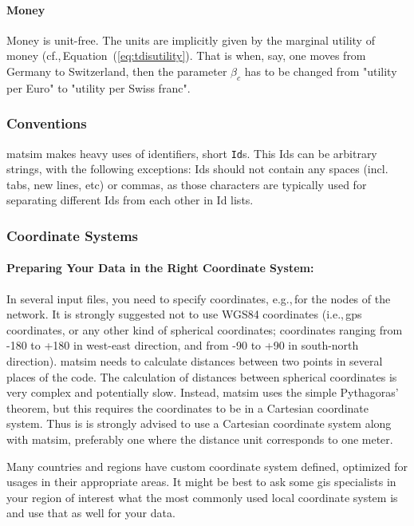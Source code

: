 \paragraph{Money}

Money is unit-free. The units are implicitly given by the marginal utility of money (cf.,\,Equation~(\ref{eq:tdisutility}). That is when, say, one moves from Germany to Switzerland, then the parameter $\beta_c$ has to be changed from "utility per Euro" to "utility per Swiss franc".

\subsubsection{Conventions}
\gls{matsim} makes heavy uses of identifiers, short \lstinline|Id|s. This Ids can be arbitrary strings, with the following exceptions: Ids should not contain any spaces (incl. tabs, new lines, etc) or commas, as those characters are typically used for separating different Ids from each other in Id lists. 

\subsubsection{Coordinate Systems}
\label{sec:coordinatesystems}
\paragraph{Preparing Your Data in the Right Coordinate System:}
In several input files, you need to specify coordinates, e.g.,\,for the nodes of the network. It is strongly suggested not to use WGS84 coordinates (i.e.,\,\gls{gps} coordinates, or any other kind of spherical coordinates; coordinates ranging from -180 to +180 in west-east direction, and from -90 to +90 in south-north direction). \gls{matsim} needs to calculate distances between two points in several places of the code. The calculation of distances between spherical coordinates is very complex and potentially slow. Instead, \gls{matsim} uses the simple Pythagoras' theorem, but this requires the coordinates to be in a Cartesian coordinate system. Thus is is strongly advised to use a Cartesian coordinate system along with \gls{matsim}, preferably one where the distance unit corresponds to one meter.

Many countries and regions have custom coordinate system defined, optimized for usages in their appropriate areas. It might be best to ask some \gls{gis} specialists in your region of interest what the most commonly used local coordinate system is and use that as well for your data.

